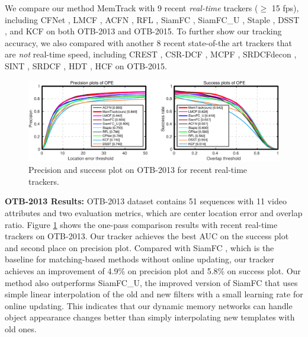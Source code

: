 \documentclass[runningheads]{llncs}
\newcommand{\yty}[1]{\textcolor{black}{#1}}
\begin{document}
We compare our method MemTrack with 9 recent {\em real-time} trackers ($\geq$ 15 fps), including CFNet \cite{Valmadre2017}, LMCF \cite{Wang2017}, ACFN \cite{Choi2017}, RFL \cite{Yang2017}, SiamFC \cite{Bertinetto2016}, SiamFC\_U \cite{Valmadre2017}, Staple \cite{Bertinetto2016-1}, DSST \cite{Danelljan2014}, and KCF \cite{Henriques2015} on both OTB-2013 and OTB-2015. 
To further show our tracking accuracy, we also compared with another 8 recent state-of-the art trackers that are {\em not} real-time speed, including CREST \cite{Song2017},  CSR-DCF \cite{Lukezic2017}, MCPF \cite{Zhang2017}, SRDCFdecon \cite{Danelljan2016}, SINT \cite{Tao2016}, SRDCF \cite{Danelljan2015}, HDT \cite{Qi2016}, HCF \cite{Ma2015} on OTB-2015.

\begin{figure}[t]
	\begin{center}
		\includegraphics[width=0.85\linewidth]{figs/realtime-cvpr13.pdf}
	\end{center}
	\caption{Precision and success plot on OTB-2013 for recent real-time trackers.
	}
	\label{fig:8}
\end{figure}

\textbf{OTB-2013 Results:} OTB-2013 \cite{Wu2013} dataset contains 51 sequences with 11 video attributes and two evaluation metrics, which are center location error and overlap ratio. Figure \ref{fig:8} shows the one-pass comparison results with recent real-time trackers on OTB-2013. Our tracker achieves the best AUC on the success plot and second place on precision plot. Compared with SiamFC \cite{Bertinetto2016}, which is the baseline for matching-based methods without online updating, our tracker 
achieves an improvement of 4.9\% on precision plot and 5.8\% on success plot.
Our method also outperforms SiamFC\_U, the improved version of SiamFC \cite{Valmadre2017} that uses simple linear interpolation of the old and new filters with a small learning rate for online updating. 
This indicates that our dynamic memory networks can handle object appearance changes better than simply interpolating new templates with old ones.
\end{document}
